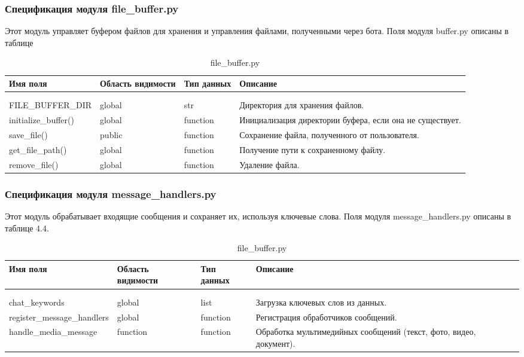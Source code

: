 \subsubsection{Спецификация модуля file\_buffer.py}
Этот модуль управляет буфером файлов для хранения и управления файлами, полученными через бота. Поля модуля buffer.py описаны в таблице 
\begin{xltabular}{\textwidth}{|p{4.5cm}|p{2cm}|p{2cm}|X|}
	\caption{file\_buffer.py\label{news3:table}}\\ \hline
	\centrow Имя поля  & \centrow Область видимости & \centrow Тип данных &\centrow Описание  \\ \hline
	 &  &  &  \\ \hline
	\endfirsthead
	 &  &  &  \\ \hline
	\finishhead
	FILE\_BUFFER\_DIR & global& str & Директория для хранения файлов. \\ \hline
	initialize\_buffer() & global& function & Инициализация директории буфера, если она не существует. \\ \hline
	save\_file() & public& function & Сохранение файла, полученного от пользователя. \\ \hline
	get\_file\_path() & global & function & Получение пути к сохраненному файлу. \\ \hline
	remove\_file() & global & function & Удаление файла. \\ \hline
\end{xltabular}
\subsubsection{Спецификация модуля message\_handlers.py}
Этот модуль обрабатывает входящие сообщения и сохраняет их, используя ключевые слова. Поля модуля message\_handlers.py описаны в таблице 4.4.

\begin{xltabular}{\textwidth}{|p{4.5cm}|p{2cm}|p{2cm}|X|}
	\caption{file\_buffer.py\label{news4:table}}\\ \hline
	\centrow Имя поля  & \centrow Область видимости & \centrow Тип данных &\centrow Описание  \\ \hline
	 &  &  &  \\ \hline
	\endfirsthead
	 &  &  &  \\ \hline
	\finishhead
	chat\_keywords & global& list & Загрузка ключевых слов из данных. \\ \hline
	register\_message\_handlers & global& function & Регистрация обработчиков сообщений. \\ \hline
	handle\_media\_message & function& function & Обработка мультимедийных сообщений (текст, фото, видео, документ). \\ \hline
\end{xltabular}
